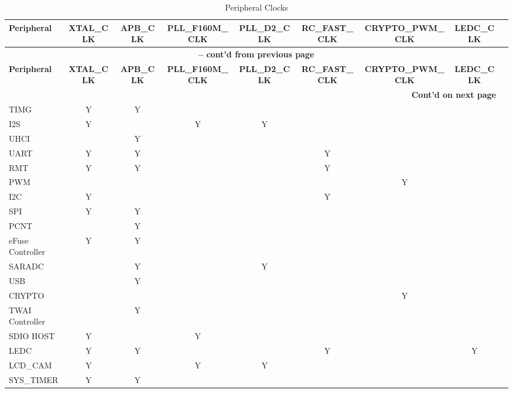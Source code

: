 \documentclass[main\_\_EN.tex]{subfiles}
\begin{document}
\begin{landscape}
\begin{longtable}[c]{|p{2.5cm}|c|c|c|c|c|c|c|c| }
 \caption{Peripheral Clocks}
    \label{tab:resclk-periph-clks} \\
  \hline
        \rowcolor{lightgray}
        \textbf{Peripheral} &  \textbf{XTAL\_CLK} &  \textbf{APB\_CLK} &  \textbf{PLL\_F160M\_CLK} &  \textbf{PLL\_D2\_CLK} &  \textbf{RC\_FAST\_CLK} &  \textbf{CRYPTO\_PWM\_CLK} &   \textbf{LEDC\_CLK}\\\hline
        \endfirsthead

       \multicolumn{8}{c}{\bfseries \tablename\ \thetable{} -- cont'd from previous page}\\\hline
       \rowcolor{lightgray}
        \textbf{Peripheral} &  \textbf{XTAL\_CLK} &  \textbf{APB\_CLK} &  \textbf{PLL\_F160M\_CLK} &  \textbf{PLL\_D2\_CLK} &  \textbf{RC\_FAST\_CLK} &  \textbf{CRYPTO\_PWM\_CLK} &   \textbf{LEDC\_CLK}\\\hline
        \endhead

    \multicolumn{8}{r}{\textbf{Cont'd on next page}} \\
    \endfoot
    \endlastfoot
    \hline
        TIMG & Y & Y &   &   &   & &\\
        \hline
        I2S  & Y &   & Y & Y &   & &\\
        \hline
        UHCI &  & Y  &   &   &   & &\\
        \hline
        UART & Y & Y &    &   & Y & &\\
        \hline
        RMT  & Y & Y &    &   & Y & &\\
        \hline
        PWM  &   &   &   &   &   &Y& \\
        \hline
        I2C  & Y &   &   &   & Y & &\\
        \hline
        SPI  & Y & Y &   &   &   & &\\
        \hline
        PCNT &   & Y &   &   &   & &\\
        \hline
        eFuse Controller & Y  & Y &   &   &   & &\\
        \hline
        SARADC &   & Y &   &  Y &   & &\\
        \hline
        USB &   & Y &   &   &   & &\\
        \hline
        CRYPTO  &   &   &   &   &   &Y &\\
        \hline
        TWAI Controller &  & Y &  & & & &\\
        \hline
        SDIO HOST  & Y &  & Y &   &   & &\\
        \hline
        LEDC & Y&  Y & &   &  Y & & Y\\
        \hline
        LCD\_CAM & Y &   &Y &  Y &   & &\\
        \hline
        SYS\_TIMER& Y & Y &   &   &   & &\\
        \hline
\end{longtable}
\end{landscape}
\end{document}
